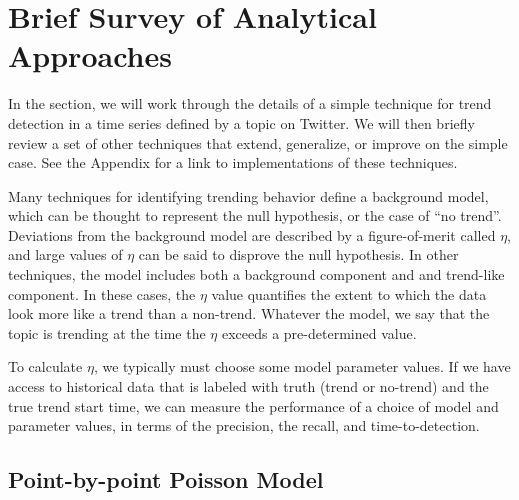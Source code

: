 \documentclass{article}
\begin{document}
\section{Brief Survey of Analytical Approaches}
\label{techniques}

In the section, we will work through the details of a simple technique for
trend detection in a time series defined by a topic on Twitter. We will then briefly
review a set of other techniques that extend, generalize, or improve on the
simple case. See the Appendix for a link to implementations of these
techniques.

Many techniques for identifying trending behavior define a background model,
which can be thought to represent the null hypothesis, or the case of “no
trend”. Deviations from the background model are described by a figure-of-merit
called $\eta$,
and large values of $\eta$ can be said to disprove the null hypothesis. 
In other techniques, the model includes both a background component and
and trend-like component. In these cases, the $\eta$ value quantifies the 
extent to which the data look more like a trend than a non-trend. 
Whatever the model, we say that the topic is trending at the time the
$\eta$ exceeds a pre-determined value. 

To calculate $\eta$, we typically must choose some model parameter values. 
If we have access to historical data that is labeled with truth 
(trend or no-trend) and the true trend start time, we
can measure the performance of a choice of model and parameter values, in terms
of the precision, the recall, and time-to-detection. 

\subsection{Point-by-point Poisson Model}
\label{pbppm}
\end{document}
